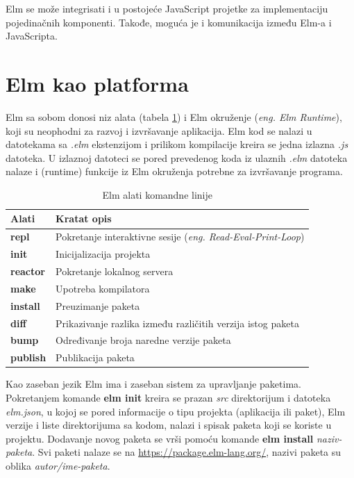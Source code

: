 \documentclass[12pt,oneside]{memoir}
\begin{document}
Elm se može integrisati i u postojeće JavaScript projetke za implementaciju pojedinačnih komponenti. 
Takođe, moguća je i komunikacija između Elm-a i JavaScripta. 

\section{Elm kao platforma}
Elm sa sobom donosi niz alata (tabela \ref{table:1}) i Elm okruženje (\emph{eng. Elm Runtime}), koji su 
neophodni za razvoj i izvršavanje aplikacija. Elm kod se nalazi u datotekama sa \emph{.elm} ekstenzijom i 
prilikom kompilacije kreira se jedna izlazna \emph{.js} datoteka. U izlaznoj datoteci se pored prevedenog 
koda iz ulaznih \emph{.elm} datoteka nalaze i (runtime) funkcije iz Elm okruženja potrebne za izvršavanje programa.


\begin{table}[h!]
\centering
\begin{tabular}{|l l|} 
 \hline 
 Alati & Kratat opis  \\ [0.5ex] 
 \hline
  \textbf{repl} & Pokretanje interaktivne sesije (\emph{eng. Read-Eval-Print-Loop}) \\ 
  \textbf{init} & Inicijalizacija projekta \\
  \textbf{reactor} & Pokretanje lokalnog servera \\
  \textbf{make} & Upotreba kompilatora \\
  \textbf{install}  & Preuzimanje paketa \\ 
  \textbf{diff} & Prikazivanje razlika između različitih verzija istog paketa \\
  \textbf{bump} & Određivanje broja naredne verzije paketa  \\
  \textbf{publish} & Publikacija paketa \\[1ex] 
 \hline
\end{tabular}
\caption{Elm alati komandne linije}
\label{table:1}
\end{table}

 
Kao zaseban jezik Elm ima i zaseban sistem za upravljanje paketima.
Pokretanjem komande \textbf{elm init} kreira se prazan \emph{src} direktorijum i 
datoteka \emph{elm.json}, u kojoj se pored informacije o tipu projekta (aplikacija ili paket), 
Elm verzije i liste direktorijuma sa kodom, nalazi i spisak paketa koji se koriste u projektu. 
Dodavanje novog paketa se vrši pomoću komande \textbf{elm install} \emph{naziv-paketa}. 
Svi paketi nalaze se na \url{https://package.elm-lang.org/}, nazivi paketa su oblika \emph{autor/ime-paketa}.
\end{document}
